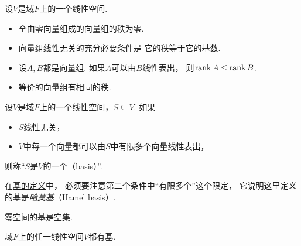 \begin{property}
设\(V\)是域\(F\)上的一个线性空间.
\begin{itemize}
	\item 全由零向量组成的向量组的秩为零.

	\item 向量组线性无关的充分必要条件是
	它的秩等于它的基数.

	\item 设\(A,B\)都是向量组.
	如果\(A\)可以由\(B\)线性表出，
	则\(\rank A \leq \rank B\).

	\item 等价的向量组有相同的秩.
\end{itemize}
\end{property}

\begin{definition}\label{definition:线性空间.线性空间的基}
设\(V\)是域\(F\)上的一个线性空间，\(S \subseteq V\).
如果\begin{itemize}
	\item \(S\)线性无关，
	\item \(V\)中每一个向量都可以由\(S\)中有限多个向量线性表出，
\end{itemize}
则称“\(S\)是\(V\)的一个（basis）”.
\end{definition}
\begin{remark}
在\hyperref[definition:线性空间.线性空间的基]{基的定义}中，
必须要注意第二个条件中“有限多个”这个限定，
它说明这里定义的基是\emph{哈莫基}（Hamel basis）.
\end{remark}

\begin{property}\label{theorem:线性空间的结构.零空间的基是空集}
零空间的基是空集.
\end{property}

\begin{property}
域\(F\)上的任一线性空间\(V\)都有基.
\end{property}

